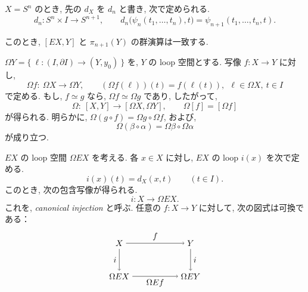 \documentclass[12pt, leqno]{ltjsarticle}
\newcommand{\Ex}{E}        %
\newcommand{\Ox}{\Omega}   %
\numberwithin{equation}{section}
\theoremstyle{plain}
\theoremstyle{definition}
\theoremstyle{remark}
\begin{document}
$X=S^n$ のとき, 先の $d_X$ を $d_n$ と書き, 
次で定められる.
\begin{equation}
d_n:S^n\times I\longrightarrow S^{n+1},\qquad
d_n\bigl(\psi_n(t_1,\ldots,t_n),t\bigr)=\psi_{n+1}(t_1,\ldots,t_n,t).
\end{equation}

このとき, \([\Ex X, Y]\) と \(\pi_{n+1}(Y)\) の群演算は一致する. 




$\Ox Y=\{\ \ell:(I,\partial I)\to (Y,y_0)\ \}$ を, 
$Y$ の loop 空間とする. 写像 $f:X\to Y$ に対し,
\[
\Ox f:\ \Ox X\longrightarrow \Ox Y,\qquad
(\Ox f(\ell))(t)=f(\ell(t)),\ \ \ell\in\Ox X,\ t\in I
\]
で定める. もし, $f\simeq g$ なら, $\Ox f\simeq \Ox g$ であり, したがって,
\[
\Ox:\ [X,Y]\longrightarrow [\Ox X,\Ox Y],\qquad
\Omega [f] = [\Ox f]
\]
が得られる. 明らかに, 
$\Ox(g\circ f)=\Ox g\circ \Ox f$, および,
\[
\Ox(\beta\circ\alpha)=\Ox\beta\circ \Ox\alpha
\]
が成り立つ. 

$EX$ の loop 空間 $\Ox EX$ を考える. 各 $x\in X$ に対し,
\(EX\) の loop \(i(x)\) を次で定める.
\[
i(x)(t) = d_X(x,t)\qquad (t\in I).
\]
このとき, 次の包含写像が得られる.
\[
i:X\to \Ox EX.
\]
これを, \emph{canonical injection} と呼ぶ. 
任意の $f:X\to Y$ に対して, 次の図式は可換である：
\begin{equation}\label{eq:loop-susp-comm}
\begin{tikzpicture}[baseline=(current bounding box.center)]
\node (X) at (0,0) {$X$};
\node (Y) at (3,0) {$Y$};
\node (OX) at (0,-1.4) {$\Ox EX$};
\node (OY) at (3,-1.4) {$\Ox EY$};
\draw[->] (X)--node[above] {$f$} (Y);
\draw[->] (X)--node[left] {$i$} (OX);
\draw[->] (Y)--node[right] {$i$} (OY);
\draw[->] (OX)--node[below] {$\Ox Ef$} (OY);
\end{tikzpicture}
\end{equation}
\end{document}
